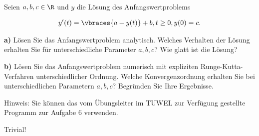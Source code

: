 \begin{exercise}
  Seien $a,b,c \in \R$  und $y$ die Lösung des Anfangswertproblems

  \begin{align}
    y'(t)=\vbraces{a-y(t)} + b, \text{} t\geq 0,\text{} y(0) = c.
  \end{align}

  \textbf{a) }Lösen Sie das Anfangswertproblem analytisch. Welches Verhalten der Lösung
  erhalten Sie für unterschiedliche Parameter $a,b,c$? Wie glatt ist die Lösung?

  \textbf{b) }Lösen Sie das Anfangswertproblem numerisch mit expliziten Runge-Kutta-Verfahren
  unterschiedlicher Ordnung. Welche Konvergenzordnung erhalten Sie bei unterschiedlichen
  Parametern $a,b,c$? Begründen Sie Ihre Ergebnisse.

  Hinweis: Sie können das vom Übungsleiter im TUWEL zur Verfügung gestellte Programm zur
  Aufgabe 6 verwenden.
\end{exercise}

\begin{solution}
  Trivial!
\end{solution}
